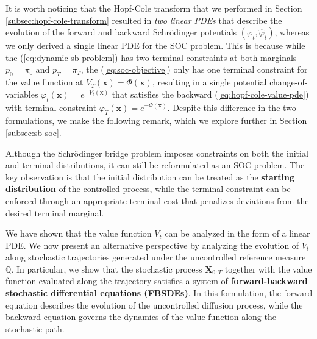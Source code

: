 \documentclass{article}
\begin{document}
It is worth noticing that the Hopf-Cole transform that we performed in Section \ref{subsec:hopf-cole-transform} resulted in \textit{two linear PDEs} that describe the evolution of the forward and backward Schrödinger potentials $(\varphi_t,\hat\varphi_t)$, whereas we only derived a single linear PDE for the SOC problem. This is because while the (\ref{eq:dynamic-sb-problem}) has two terminal constraints at both marginals $p_0=\pi_0$ and $p_T=\pi_T$, the (\ref{eq:soc-objective}) only has one terminal constraint for the value function at $V_T(\boldsymbol{x})=\Phi(\boldsymbol{x})$, resulting in a single potential change-of-variables $\varphi_t(\boldsymbol{x})=e^{-V_t(\boldsymbol{x})}$ that satisfies the backward (\ref{eq:hopf-cole-value-pde}) with terminal constraint $\varphi_T(\boldsymbol{x})=e^{-\Phi(\boldsymbol{x})}$. Despite this difference in the two formulations, we make the following remark, which we explore further in Section \ref{subsec:sb-soc}.

\begin{remark}[]
    Although the Schrödinger bridge problem imposes constraints on both the initial and terminal distributions, it can still be reformulated as an SOC problem. The key observation is that the initial distribution can be treated as the \textbf{starting distribution} of the controlled process, while the terminal constraint can be enforced through an appropriate terminal cost that penalizes deviations from the desired terminal marginal.
\end{remark}

We have shown that the value function $V_t$  can be analyzed in the form of a linear PDE. We now present an alternative perspective by analyzing the evolution of $V_t$ along stochastic trajectories generated under the uncontrolled reference measure $\mathbb{Q}$. In particular, we show that the stochastic process $\boldsymbol{X}_{0:T}$ together with the value function evaluated along the trajectory satisfies a system of \textbf{forward-backward stochastic differential equations (FBSDEs)}. In this formulation, the forward equation describes the evolution of the uncontrolled diffusion process, while the backward equation governs the dynamics of the value function along the stochastic path.
\end{document}
